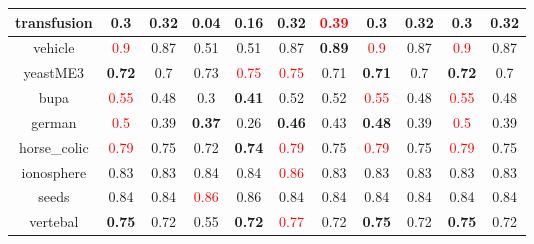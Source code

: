 \documentclass{article}%
\begin{document}
\begin{tabular}{c|cccccccccc}
\hline%
transfusion&0.3&\textbf{0.32}&0.04&\textbf{0.16}&0.32&\textcolor{red}{ 
0.39
}&0.3&\textbf{0.32}&0.3&\textbf{0.32}\\%
\hline%
vehicle&\textcolor{red}{ 
0.9
}&0.87&0.51&0.51&0.87&\textbf{0.89}&\textcolor{red}{ 
0.9
}&0.87&\textcolor{red}{ 
0.9
}&0.87\\%
\hline%
yeastME3&\textbf{0.72}&0.7&0.73&\textcolor{red}{ 
0.75
}&\textcolor{red}{ 
0.75
}&0.71&\textbf{0.71}&0.7&\textbf{0.72}&0.7\\%
\hline%
bupa&\textcolor{red}{ 
0.55
}&0.48&0.3&\textbf{0.41}&0.52&0.52&\textcolor{red}{ 
0.55
}&0.48&\textcolor{red}{ 
0.55
}&0.48\\%
\hline%
german&\textcolor{red}{ 
0.5
}&0.39&\textbf{0.37}&0.26&\textbf{0.46}&0.43&\textbf{0.48}&0.39&\textcolor{red}{ 
0.5
}&0.39\\%
\hline%
horse\_colic&\textcolor{red}{ 
0.79
}&0.75&0.72&\textbf{0.74}&\textcolor{red}{ 
0.79
}&0.75&\textcolor{red}{ 
0.79
}&0.75&\textcolor{red}{ 
0.79
}&0.75\\%
\hline%
ionosphere&0.83&0.83&0.84&0.84&\textcolor{red}{ 
0.86
}&0.83&0.83&0.83&0.83&0.83\\%
\hline%
seeds&0.84&0.84&\textcolor{red}{ 
0.86
}&0.86&0.84&0.84&0.84&0.84&0.84&0.84\\%
\hline%
vertebal&\textbf{0.75}&0.72&0.55&\textbf{0.72}&\textcolor{red}{ 
0.77
}&0.72&\textbf{0.75}&0.72&\textbf{0.75}&0.72\\%
\hline%
\end{tabular}

%
\end{document}
